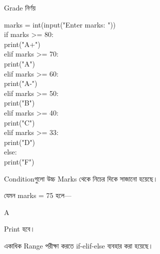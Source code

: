 \begin{codeoutputbox}{Grade নির্ণয়}

\noindent
\begin{minipage}[t]{0.53\linewidth}
\codeheading

\begin{english}
\ttfamily
marks = int(input("Enter marks: "))\\[0.5mm]
if marks >= 80:\\
\hspace*{4mm}print("A+")\\
elif marks >= 70:\\
\hspace*{4mm}print("A")\\
elif marks >= 60:\\
\hspace*{4mm}print("A-")\\
elif marks >= 50:\\
\hspace*{4mm}print("B")\\
elif marks >= 40:\\
\hspace*{4mm}print("C")\\
elif marks >= 33:\\
\hspace*{4mm}print("D")\\
else:\\
\hspace*{4mm}print("F")
\end{english}

\end{minipage}
\hfill
\begin{minipage}[t]{0.43\linewidth}
\outputheading

Conditionগুলো উচ্চ Marks থেকে নিচের দিকে সাজানো হয়েছে।

\medskip

যেমন
\textenglish{\ttfamily marks = 75}
হলে—

\begin{center}
\textenglish{\ttfamily A}
\end{center}

Print হবে।

\medskip

একাধিক Range পরীক্ষা করতে
\textenglish{\ttfamily if-elif-else}
ব্যবহার করা হয়েছে।

\end{minipage}

\end{codeoutputbox}


